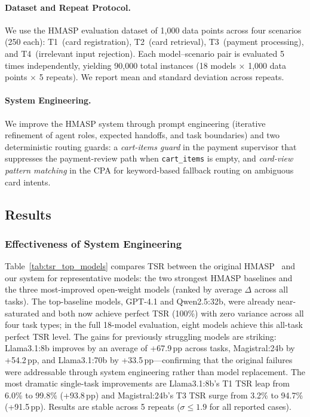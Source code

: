 \paragraph{Dataset and Repeat Protocol.} We use the HMASP evaluation dataset of 1{,}000 data points across four scenarios (250 each): T1~(card registration), T2~(card retrieval), T3~(payment processing), and T4~(irrelevant input rejection). Each model--scenario pair is evaluated 5 times independently, yielding 90{,}000 total instances (18 models $\times$ 1{,}000 data points $\times$ 5 repeats). We report mean and standard deviation across repeats.

\paragraph{System Engineering.} We improve the HMASP system through prompt engineering (iterative refinement of agent roles, expected handoffs, and task boundaries) and two deterministic routing guards: a \textit{cart-items guard} in the payment supervisor that suppresses the payment-review path when \texttt{cart\_items} is empty, and \textit{card-view pattern matching} in the CPA for keyword-based fallback routing on ambiguous card intents.

\subsection{Results}

\subsubsection{Effectiveness of System Engineering}
Table~\ref{tab:tsr_top_models} compares TSR between the original HMASP~\cite{huang2026hmasp} and our system for representative models: the two strongest HMASP baselines and the three most-improved open-weight models (ranked by average $\Delta$ across all tasks). The top-baseline models, GPT-4.1 and Qwen2.5:32b, were already near-saturated and both now achieve perfect TSR (100\%) with zero variance across all four task types; in the full 18-model evaluation, eight models achieve this all-task perfect TSR level. The gains for previously struggling models are striking: Llama3.1:8b improves by an average of +67.9\,pp across tasks, Magistral:24b by +54.2\,pp, and Llama3.1:70b by +33.5\,pp---confirming that the original failures were addressable through system engineering rather than model replacement. The most dramatic single-task improvements are Llama3.1:8b's T1 TSR leap from 6.0\% to 99.8\% (+93.8\,pp) and Magistral:24b's T3 TSR surge from 3.2\% to 94.7\% (+91.5\,pp). Results are stable across 5 repeats ($\sigma\leq1.9$ for all reported cases).

